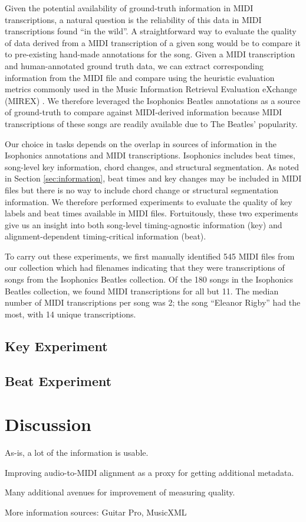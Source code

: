 \documentclass{article}
\begin{document}
Given the potential availability of ground-truth information in MIDI transcriptions, a natural question is the reliability of this data in MIDI transcriptions found ``in the wild''.
A straightforward way to evaluate the quality of data derived from a MIDI transcription of a given song would be to compare it to pre-existing hand-made annotations for the song.
Given a MIDI transcription and human-annotated ground truth data, we can extract corresponding information from the MIDI file and compare using the heuristic evaluation metrics commonly used in the Music Information Retrieval Evaluation eXchange (MIREX) \cite{downie2008music}.
We therefore leveraged the Isophonics Beatles annotations \cite{mauch2009omras2} as a source of ground-truth to compare against MIDI-derived information because MIDI transcriptions of these songs are readily available due to The Beatles' popularity.

Our choice in tasks depends on the overlap in sources of information in the Isophonics annotations and MIDI transcriptions.
Isophonics includes beat times, song-level key information, chord changes, and structural segmentation.
As noted in Section \ref{sec:information}, beat times and key changes may be included in MIDI files but there is no way to include chord change or structural segmentation information.
We therefore performed experiments to evaluate the quality of key labels and beat times available in MIDI files.
Fortuitously, these two experiments give us an insight into both song-level timing-agnostic information (key) and alignment-dependent timing-critical information (beat).

To carry out these experiments, we first manually identified 545 MIDI files from our collection which had filenames indicating that they were transcriptions of songs from the Isophonics Beatles collection.
Of the 180 songs in the Isophonics Beatles collection, we found MIDI transcriptions for all but 11.
The median number of MIDI transcriptions per song was 2; the song ``Eleanor Rigby'' had the most, with 14 unique transcriptions.

\subsection{Key Experiment}

\subsection{Beat Experiment}

\section{Discussion}
\label{sec:discussion}

As-is, a lot of the information is usable.

Improving audio-to-MIDI alignment as a proxy for getting additional metadata.

Many additional avenues for improvement of measuring quality.

More information sources: Guitar Pro, MusicXML


\end{document}
